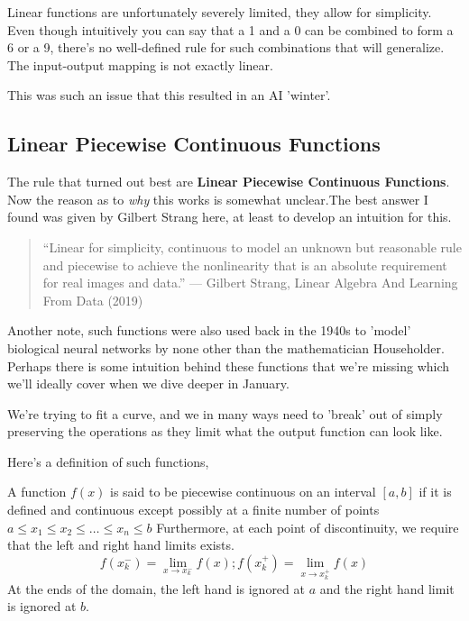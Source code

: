 \documentclass[11pt]{article}
\begin{document}
Linear functions are unfortunately severely limited, they allow for simplicity. Even though intuitively you can say that a 1 and a 0 can be combined to form a 6 or a 9, there's no well-defined rule for such combinations that will generalize. The input-output mapping is not exactly linear.

This was such an issue that this resulted in an AI 'winter'.
\subsection{Linear Piecewise Continuous Functions}
\label{sec:org0ebfff8}
The rule that turned out best are \textbf{Linear Piecewise Continuous Functions}. Now the reason as to \emph{why} this works is somewhat unclear.The best answer I found was given by Gilbert Strang here, at least to develop an intuition for this.

\begin{quote}
``Linear for simplicity, continuous to model an unknown but reasonable rule and piecewise to achieve the nonlinearity that is an absolute requirement for real images and data.'' --- Gilbert Strang, Linear Algebra And Learning From Data (2019)
\end{quote}

Another note, such functions were also used back in the 1940s to 'model' biological neural networks by none other than the mathematician Householder. Perhaps there is some intuition behind these functions that we're missing which we'll ideally cover when we dive deeper in January.

We're trying to fit a curve, and we in many ways need to 'break' out of simply preserving the operations as they limit what the output function can look like.

Here's a definition of such functions,

\begin{definition}
   A function $f(x)$ is said to be piecewise continuous on an interval $[a,b]$ if it is defined and continuous except possibly at a finite number of points $a\leq x_1 \leq x_2 \leq \dots \leq x_n \leq b$ Furthermore, at each point of discontinuity, we require that the left and right hand limits exists.
   \[
      f(x_k^-) = \lim_{x \rightarrow x_k^-} f(x); f(x_k^+) = \lim_{x\rightarrow x_k^+} f(x)
   \]
   At the ends of the domain, the left hand is ignored at $a$ and the right hand limit is ignored at $b$.
\end{definition}
\end{document}
